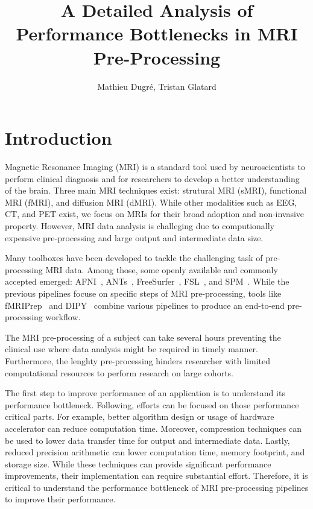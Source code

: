 \documentclass[conference]{IEEEtran}
\title{A Detailed Analysis of Performance Bottlenecks in MRI Pre-Processing}
\author{Mathieu Dugr\'e, Tristan Glatard}
\begin{document}
\maketitle

\begin{abstract}
																																																											
\end{abstract}


\section{Introduction}
Magnetic Resonance Imaging (MRI) is a standard tool used by neuroscientists to
perform clinical diagnosis and for researchers to develop a better understanding
of the brain.
Three main MRI techniques exist: strutural MRI (sMRI), functional MRI (fMRI),
and diffusion MRI (dMRI).
While other modalities such as EEG, CT, and PET exist, we focus on MRIs for
their broad adoption and non-invasive property.
However, MRI data analysis is challeging due to computionally expensive
pre-processing and large output and intermediate data size.

Many toolboxes have been developed to tackle the challenging task of
pre-processing MRI data.
Among those, some openly available and commonly accepted emerged:
AFNI~\cite{Cox1996-sl}, ANTs~\cite{Avants_undated-fu},
FreeSurfer~\cite{Fischl2012-bp}, FSL~\cite{Jenkinson2012-cq}, and
SPM~\cite{Friston2007-ag}.
While the previous pipelines focuse on specific steps of MRI pre-processing,
tools like fMRIPrep~\cite{Esteban2019-og} and DIPY~\cite{Garyfallidis2014-ve}
combine various pipelines to produce an end-to-end pre-processing workflow.

The MRI pre-processing of a subject can take several hours preventing the
clinical use where data analysis might be required in timely manner.
Furthermore, the lenghty pre-processing hinders researcher with limited 
computational resources to perform research on large cohorts.

The first step to improve performance of an application is to understand its
performance bottleneck.
Following, efforts can be focused on those performance critical parts.
For example, better algorithm design or usage of hardware accelerator can 
reduce computation time.
Moreover, compression techniques can be used to lower data transfer time for
output and intermediate data.
Lastly, reduced precision arithmetic can lower computation time,
memory footprint, and storage size.
While these techniques can provide significant performance improvements, their
implementation can require substantial effort.
Therefore, it is critical to understand the performance bottleneck of MRI
pre-processing pipelines to improve their performance.
\end{document}
